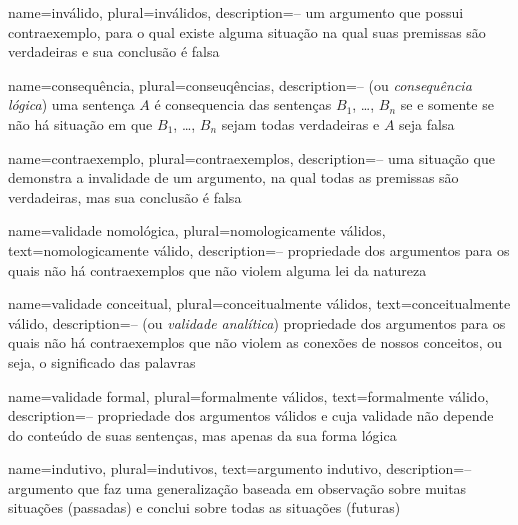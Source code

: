   {
  name=inválido,
  plural=inválidos,
  description={-- um argumento que possui contraexemplo, para o qual existe alguma situação na qual suas premissas são verdadeiras e sua conclusão é falsa}
  }
  
    {
    name=consequência,
    plural=conseuqências,
    description={-- (ou \textit{consequência lógica}) uma sentença $A$ é consequencia das sentenças $B_1$, \dots, $B_n$ se e somente se não há situação em que $B_1$, \dots, $B_n$ sejam todas verdadeiras e $A$ seja falsa}
    }
  
  {
  name=contraexemplo,
  plural=contraexemplos,
  description={-- uma situação que demonstra a invalidade de um argumento, na qual todas as premissas são verdadeiras, mas sua conclusão é falsa}
  }
  
  {
  name=validade nomológica,
  plural=nomologicamente válidos,
  text=nomologicamente válido,
  description={-- propriedade dos argumentos para os quais não há contraexemplos que não violem alguma lei da natureza}
  }
  
  {
  name=validade conceitual,
  plural=conceitualmente válidos,
  text=conceitualmente válido,
  description={-- (ou \textit{validade analítica}) propriedade dos argumentos para os quais não há contraexemplos que não violem as conexões de nossos conceitos, ou seja, o significado das palavras}
  }
  
  {
  name=validade formal,
  plural=formalmente válidos,
  text=formalmente válido,
  description={-- propriedade dos argumentos válidos e cuja validade não depende do conteúdo de suas sentenças, mas apenas da sua forma lógica}
  }
  
  {
  name=indutivo,
  plural=indutivos,
  text=argumento indutivo,
  description={-- argumento que faz uma generalização baseada em observação sobre muitas situações (passadas) e conclui sobre todas as situações (futuras)}
  }
  
